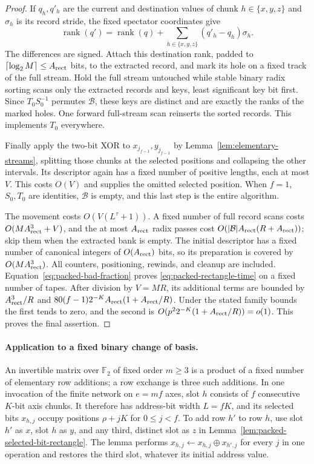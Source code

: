 \begin{proof}
If $q_h,q'_h$ are the current and destination values of chunk
$h\in\{x,y,z\}$ and $\sigma_h$ is its record stride, the fixed
spectator coordinates give
\[
 \operatorname{rank}(q')=\operatorname{rank}(q)+
       \sum_{h\in\{x,y,z\}}(q'_h-q_h)\sigma_h.
\]
The differences are signed. Attach this destination rank, padded to
$\lceil\log_2M\rceil\le A_{\rm rect}$ bits, to the extracted record, and mark its
hole on a fixed track of the full stream. Hold the full stream untouched
while stable binary radix sorting scans only the extracted records and
keys, least significant key bit first. Since $T_0S_0^{-1}$ permutes
$\mathcal B$, these keys are distinct and are exactly the ranks of the
marked holes. One forward full-stream scan reinserts the sorted records.
This implements $T_0$ everywhere.

Finally apply the two-bit XOR to $x_{j_{f-1}},y_{j_{f-1}}$ by
Lemma~\ref{lem:elementary-streams}, splitting those chunks at the
selected positions and collapsing the other intervals. Its descriptor
again has a fixed number of positive lengths, each at most $V$.
This costs $O(V)$ and supplies the omitted selected position. When
$f=1$, $S_0,T_0$ are identities, $\mathcal B$ is empty, and this last
step is the entire algorithm.

The movement costs $O(V(L^\tau+1))$. A fixed number of full record scans
costs $O(MA_{\rm rect}^3+V)$, and the at most $A_{\rm rect}$ radix passes cost
$O(|\mathcal B|A_{\rm rect}(R+A_{\rm rect}))$; skip them when the extracted bank is empty.
The initial descriptor has a fixed number of canonical integers of
$O(A_{\rm rect})$ bits, so its preparation is covered by $O(MA_{\rm rect}^3)$.
All counters, positioning, rewinds, and cleanup are included.
Equation~\eqref{eq:packed-bad-fraction} proves
\eqref{eq:packed-rectangle-time} on a fixed number of tapes.
After division by $V=MR$, its additional terms are bounded by
$A_{\rm rect}^3/R$ and
$80(f-1)2^{-K}A_{\rm rect}(1+A_{\rm rect}/R)$. Under the stated family bounds
the first tends to zero, and the second is
$O(p^2 2^{-K}(1+A_{\rm rect}/R))=o(1)$. This proves the final assertion.
\end{proof}

\paragraph{Application to a fixed binary change of basis.}
An invertible matrix over $\mathbb F_2$ of fixed order $m\ge3$ is a
product of a fixed number of elementary row additions; a row exchange
is three such additions.  In one invocation of the finite network on
$e=mf$ axes, slot $h$ consists of $f$ consecutive $K$-bit axis chunks.
It therefore has address-bit width $L=fK$, and its selected bits
$x_{h,j}$ occupy positions $\rho+jK$ for $0\le j<f$.
To add row $h'$ to row $h$, use slot $h'$ as $x$,
slot $h$ as $y$, and any third, distinct slot as $z$ in
Lemma~\ref{lem:packed-selected-bit-rectangle}.  The lemma performs
$x_{h,j}\leftarrow x_{h,j}\mathbin\oplus x_{h',j}$ for every $j$ in
one operation and restores the third slot, whatever its initial
address value.

